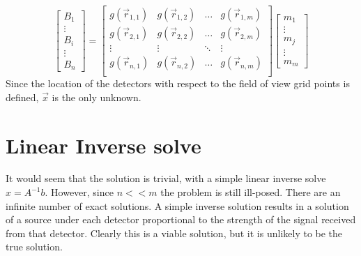 \documentclass[a4paper]{article}
\begin{document}
\begin{equation}
\begin{bmatrix}
B_{1}\\  
\vdots\\ 
B_{i}\\
\vdots\\
B_{n}
\end{bmatrix}
=
\begin{bmatrix} \label{eq:fullMatrix}
g(\vec{r}_{1,1}) & g(\vec{r}_{1,2}) & \dots  & g(\vec{r}_{1,m}) \\
g(\vec{r}_{2,1}) & g(\vec{r}_{2,2}) & \dots & g(\vec{r}_{2,m})\\
\vdots & \vdots & \ddots & \vdots\\
g(\vec{r}_{n,1}) & g(\vec{r}_{n,2}) & \hdots & g(\vec{r}_{n,m})\\
\end{bmatrix} 
\begin{bmatrix}
m_{1} \\ \vdots \\ m_{j} \\ \vdots \\ m_{m}
\end{bmatrix}
\end{equation}
Since the location of the detectors with respect to the field of view grid points is defined, $\vec{x}$ is the only unknown.  
\section{Linear Inverse solve}
It would seem that the solution is trivial, with a simple linear inverse solve $x=A^{-1}b$.  However, since $n<<m$ the problem is still ill-posed.  There are an infinite number of exact solutions.  A simple inverse solution results in a solution of a source under each detector proportional to the strength of the signal received from that detector.  Clearly this is a viable solution, but it is unlikely to be the true solution.  
\end{document}
